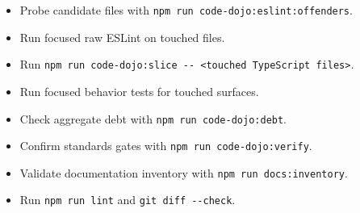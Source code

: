 \begin{itemize}
\tightlist
\item
  Probe candidate files with \texttt{n\allowbreak{}p\allowbreak{}m\allowbreak{} \allowbreak{}r\allowbreak{}u\allowbreak{}n\allowbreak{} \allowbreak{}c\allowbreak{}o\allowbreak{}d\allowbreak{}e\allowbreak{}-\allowbreak{}d\allowbreak{}o\allowbreak{}j\allowbreak{}o\allowbreak{}:\allowbreak{}e\allowbreak{}s\allowbreak{}l\allowbreak{}i\allowbreak{}n\allowbreak{}t\allowbreak{}:\allowbreak{}o\allowbreak{}f\allowbreak{}f\allowbreak{}e\allowbreak{}n\allowbreak{}d\allowbreak{}e\allowbreak{}r\allowbreak{}s}.
\item
  Run focused raw ESLint on touched files.
\item
  Run \texttt{n\allowbreak{}p\allowbreak{}m\allowbreak{} \allowbreak{}r\allowbreak{}u\allowbreak{}n\allowbreak{} \allowbreak{}c\allowbreak{}o\allowbreak{}d\allowbreak{}e\allowbreak{}-\allowbreak{}d\allowbreak{}o\allowbreak{}j\allowbreak{}o\allowbreak{}:\allowbreak{}s\allowbreak{}l\allowbreak{}i\allowbreak{}c\allowbreak{}e\allowbreak{} \allowbreak{}-\allowbreak{}-\allowbreak{} \allowbreak{}<\allowbreak{}t\allowbreak{}o\allowbreak{}u\allowbreak{}c\allowbreak{}h\allowbreak{}e\allowbreak{}d\allowbreak{} \allowbreak{}T\allowbreak{}y\allowbreak{}p\allowbreak{}e\allowbreak{}S\allowbreak{}c\allowbreak{}r\allowbreak{}i\allowbreak{}p\allowbreak{}t\allowbreak{} \allowbreak{}f\allowbreak{}i\allowbreak{}l\allowbreak{}e\allowbreak{}s\allowbreak{}>}.
\item
  Run focused behavior tests for touched surfaces.
\item
  Check aggregate debt with \texttt{n\allowbreak{}p\allowbreak{}m\allowbreak{} \allowbreak{}r\allowbreak{}u\allowbreak{}n\allowbreak{} \allowbreak{}c\allowbreak{}o\allowbreak{}d\allowbreak{}e\allowbreak{}-\allowbreak{}d\allowbreak{}o\allowbreak{}j\allowbreak{}o\allowbreak{}:\allowbreak{}d\allowbreak{}e\allowbreak{}b\allowbreak{}t}.
\item
  Confirm standards gates with \texttt{n\allowbreak{}p\allowbreak{}m\allowbreak{} \allowbreak{}r\allowbreak{}u\allowbreak{}n\allowbreak{} \allowbreak{}c\allowbreak{}o\allowbreak{}d\allowbreak{}e\allowbreak{}-\allowbreak{}d\allowbreak{}o\allowbreak{}j\allowbreak{}o\allowbreak{}:\allowbreak{}v\allowbreak{}e\allowbreak{}r\allowbreak{}i\allowbreak{}f\allowbreak{}y}.
\item
  Validate documentation inventory with \texttt{n\allowbreak{}p\allowbreak{}m\allowbreak{} \allowbreak{}r\allowbreak{}u\allowbreak{}n\allowbreak{} \allowbreak{}d\allowbreak{}o\allowbreak{}c\allowbreak{}s\allowbreak{}:\allowbreak{}i\allowbreak{}n\allowbreak{}v\allowbreak{}e\allowbreak{}n\allowbreak{}t\allowbreak{}o\allowbreak{}r\allowbreak{}y}.
\item
  Run \texttt{n\allowbreak{}p\allowbreak{}m\allowbreak{} \allowbreak{}r\allowbreak{}u\allowbreak{}n\allowbreak{} \allowbreak{}l\allowbreak{}i\allowbreak{}n\allowbreak{}t} and \texttt{g\allowbreak{}i\allowbreak{}t\allowbreak{} \allowbreak{}d\allowbreak{}i\allowbreak{}f\allowbreak{}f\allowbreak{} \allowbreak{}-\allowbreak{}-\allowbreak{}c\allowbreak{}h\allowbreak{}e\allowbreak{}c\allowbreak{}k}.
\end{itemize}

